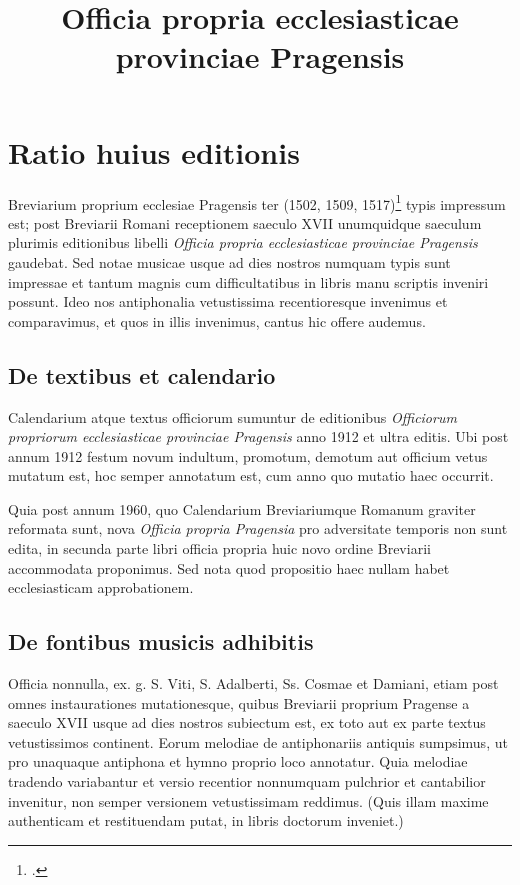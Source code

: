 \documentclass[12pt, a5paper, twoside]{book}
\title{Officia propria ecclesiasticae provinciae Pragensis}
\begin{document}
\pagestyle{empty}

\setlength{\parindent}{0.5cm}

\maketitle

\cleardoublepage

\pagestyle{plain}

\chapter*{Ratio huius editionis}

Breviarium proprium ecclesiae Pragensis ter
(1502, 1509, 1517)\footcite[242]{bohatta}
typis impressum est; post Breviarii Romani receptionem
saeculo XVII unumquidque saeculum plurimis editionibus
libelli \emph{Officia propria ecclesiasticae provinciae Pragensis} gaudebat.
Sed notae musicae usque ad dies nostros numquam typis sunt impressae
et tantum magnis cum difficultatibus in libris manu scriptis
inveniri possunt. Ideo nos antiphonalia vetustissima recentioresque
invenimus et comparavimus, et quos in illis invenimus,
cantus hic offere audemus.

\section*{De textibus et calendario}
Calendarium atque textus officiorum sumuntur de editionibus
\emph{Officiorum propriorum ecclesiasticae provinciae Pragensis}
anno 1912 et ultra editis.
Ubi post annum 1912 festum novum indultum, promotum, demotum
aut officium vetus mutatum est, hoc semper annotatum est,
cum anno quo mutatio haec occurrit.

Quia post annum 1960, quo Calendarium Breviariumque Romanum
graviter reformata sunt, nova \emph{Officia propria Pragensia}
pro adversitate temporis non sunt edita,
in secunda parte libri officia propria huic novo ordine Breviarii
accommodata proponimus. Sed nota quod propositio haec nullam habet
ecclesiasticam approbationem.

\section*{De fontibus musicis adhibitis}
Officia nonnulla, ex. g. S. Viti, S. Adalberti, Ss. Cosmae et Damiani,
etiam post omnes instaurationes mutationesque, quibus
Breviarii proprium Pragense a saeculo XVII usque ad dies nostros
subiectum est, ex toto aut ex parte textus vetustissimos
continent.
Eorum melodiae de antiphonariis antiquis sumpsimus,
ut pro unaquaque antiphona et hymno proprio loco annotatur.
Quia melodiae tradendo variabantur et versio recentior nonnumquam
pulchrior et cantabilior invenitur, non semper versionem
vetustissimam reddimus.
(Quis illam maxime authenticam et restituendam putat,
in libris doctorum inveniet.)
\end{document}
